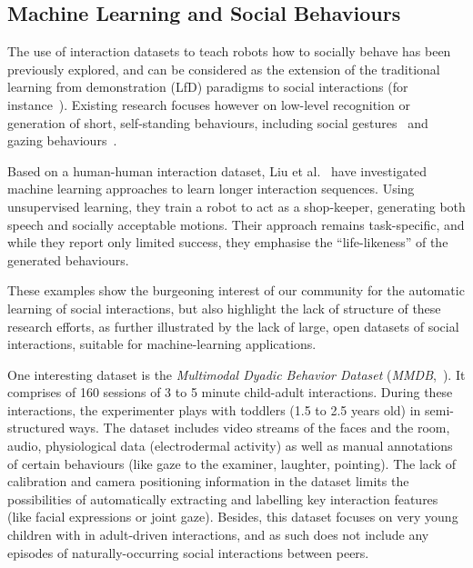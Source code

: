 \documentclass{article}
\newcommand{\etal}{et al.\xspace}
\begin{document}
\subsection*{Machine Learning and Social Behaviours}

The use of interaction datasets to teach robots how to socially behave has been
previously explored, and can be considered as the extension of the traditional
learning from demonstration (LfD) paradigms to social interactions (for
instance~\cite{nehaniv2007imitation,mohammad2015interaction}). Existing
research focuses however on low-level recognition or generation of short,
self-standing behaviours, including social gestures~\cite{nagai2005learning}
and gazing behaviours~\cite{calinon2006teaching}.

Based on a human-human interaction dataset, Liu \etal~\cite{liu2014how} have
investigated machine learning approaches to learn longer interaction sequences.
Using unsupervised learning, they train a robot to act as a shop-keeper,
generating both speech and socially acceptable motions. Their approach remains
task-specific, and while they report only limited success, they emphasise the
``life-likeness'' of the generated behaviours.

These examples show the burgeoning interest of our community for the automatic
learning of social interactions, but also highlight the lack of structure of
these research efforts, as further illustrated by the lack of large, open
datasets of social interactions, suitable for machine-learning applications.

One interesting dataset is the \emph{Multimodal Dyadic Behavior
Dataset} (\emph{MMDB},~\cite{rehg2013decoding}). It comprises of 160 sessions of
3 to 5 minute child-adult interactions. During these interactions, the
experimenter plays with toddlers (1.5 to 2.5 years old) in semi-structured ways.
The dataset includes video streams of the faces and the room, audio, physiological data
(electrodermal activity) as well as manual annotations of certain behaviours
(like gaze to the examiner, laughter, pointing). The lack of calibration and camera positioning
information in the dataset limits the possibilities of automatically extracting and
labelling key interaction features (like facial expressions or joint gaze). Besides,
this dataset focuses on very young children with in adult-driven interactions,
and as such does not include any episodes of naturally-occurring social
interactions between peers.
\end{document}
